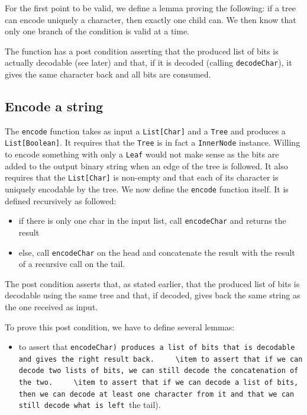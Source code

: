 \documentclass[a4paper,UKenglish,cleveref, autoref, thm-restate]{lipics-v2021}
\begin{document}
For the first point to be valid, we define a lemma proving the following: if a tree can encode uniquely a character, then exactly one child can. We then know that only one branch of the condition is valid at a time.

The function has a post condition asserting that the produced list of bits is actually decodable (see later) and that, if it is decoded (calling \lstinline{decodeChar}), it gives the same character back and all bits are consumed.

\subsection{Encode a string}
The \lstinline{encode} function takes as input a \lstinline{List[Char]} and a \lstinline{Tree} and produces a \lstinline{List[Boolean]}.
It requires that the \lstinline{Tree} is in fact a \lstinline{InnerNode} instance. Willing to encode something with only a \lstinline{Leaf} would not make sense as the bits are added to the output binary string when an edge of the tree is followed.
It also requires that the \lstinline{List[Char]} is non-empty and that each of its character is uniquely encodable by the tree.
We now define the \lstinline{encode} function itself. It is defined recursively as followed:
\begin{itemize}
    \item if there is only one char in the input list, call \lstinline{encodeChar} and returns the result
    \item else, call \lstinline{encodeChar} on the head and concatenate the result with the result of a recursive call on the tail.
\end{itemize}

The post condition asserts that, as stated earlier, that the produced list of bits is decodable using the same tree and that, if decoded, gives back the same string as the one received as input.

To prove this post condition, we have to define several lemmas:
\begin{itemize}
    \item to assert that \lstinline(encodeChar) produces a list of bits that is decodable and gives the right result back.
    \item to assert that if we can decode two lists of bits, we can still decode the concatenation of the two.
    \item to assert that if we can decode a list of bits, then we can decode at least one character from it and that we can still decode what is left (the tail).
\end{itemize}
\end{document}
